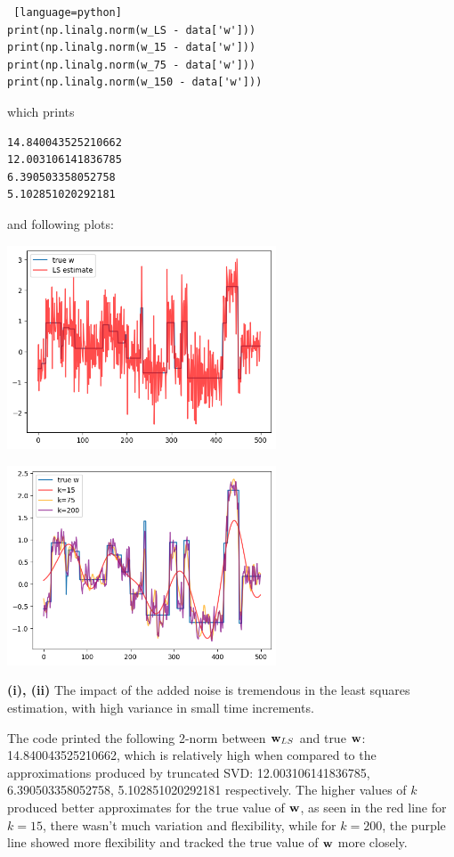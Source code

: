 \documentclass[a4paper, 12pt]{article}
\begin{document}
\begin{solution}
\begin{lstlisting} [language=python]
print(np.linalg.norm(w_LS - data['w']))
print(np.linalg.norm(w_15 - data['w']))
print(np.linalg.norm(w_75 - data['w']))
print(np.linalg.norm(w_150 - data['w']))    
\end{lstlisting}
which prints 
\begin{lstlisting}
14.840043525210662
12.003106141836785
6.390503358052758
5.102851020292181
\end{lstlisting}
and following plots:
    \begin{center}
    \includegraphics[width=8cm]{./figures/5.1c.1.png}
    \end{center}
    \begin{center}
    \includegraphics[width=8cm]{./figures/5.1c.2.png}
    \end{center}

    \textbf{(i), (ii)} The impact of the added noise is tremendous in the least squares estimation, with high variance in small time increments.

    The code printed the following 2-norm between $\mathbf{w}_{LS}$ and true $\mathbf{w}$: 14.840043525210662, which is relatively high when compared to the approximations produced by truncated SVD: 12.003106141836785, 6.390503358052758, 5.102851020292181 respectively. The higher values of $k$ produced better approximates for the true value of $\mathbf{w}$, as seen in the red line for $k=15$, there wasn't much variation and flexibility, while for $k = 200$, the purple line showed more flexibility and tracked the true value of $\mathbf{w}$ more closely.
\end{solution}
\end{document}
